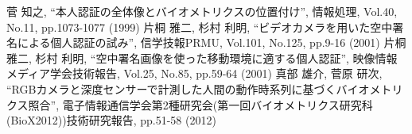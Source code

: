 \documentclass[12pt,twoside]{jreport}  %
\begin{document}
\setcounter{page}{1}   %
\tableofcontents       %
\listoffigures         %
\listoftables          %
\newpage


\setcounter{page}{1}     %

\setlength{\baselineskip}{20pt}



% 











\newpage

\begin{thebibliography}{99}%
 菅 知之, “本人認証の全体像とバイオメトリクスの位置付け”, 情報処理, Vol.40, No.11, pp.1073-1077 (1999)
 片桐 雅二, 杉村 利明, “ビデオカメラを用いた空中署名による個人認証の試み”, 信学技報PRMU, Vol.101, No.125, pp.9-16 (2001)
 片桐 雅二, 杉村 利明, “空中署名画像を使った移動環境に適する個人認証”, 映像情報メディア学会技術報告, Vol.25, No.85, pp.59-64 (2001)
 真部 雄介, 菅原 研次, “RGBカメラと深度センサーで計測した人間の動作時系列に基づくバイオメトリクス照合”, 電子情報通信学会第2種研究会(第一回バイオメトリクス研究科(BioX2012))技術研究報告, pp.51-58 (2012)
\end{thebibliography}
\end{document}
